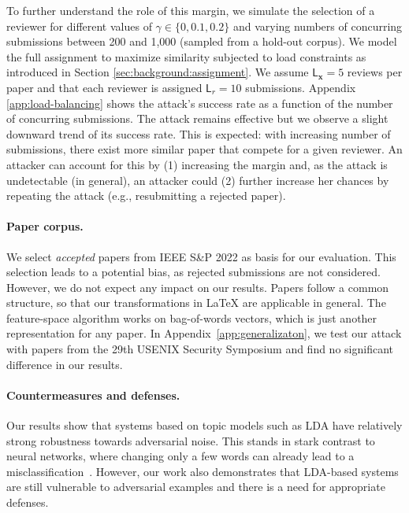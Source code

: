 \documentclass[letterpaper,twocolumn,10pt]{article}
\newcommand{\bow}{\textbf{x}}
\newcommand{\submission}{\bow}
\newcommand{\reviewer}{r}
\newcommand{\reviewerload}{\mathsf{L}_{\reviewer}}
\newcommand{\paperload}{\mathsf{L}_{\submission}}
\newcommand{\margin}{\gamma}
\begin{document}
To further understand the role of this margin, we simulate the selection of a reviewer for different values of $\margin \in \{0, 0.1, 0.2\}$ and varying numbers of concurring submissions between 200 and 1,000 (sampled from a hold-out corpus). We model the full assignment to maximize similarity subjected to load constraints as introduced in Section \ref{sec:background:assignment}. We assume $\paperload = 5$ reviews per paper and that each reviewer is assigned $\reviewerload = 10$ submissions.
Appendix \ref{app:load-balancing} shows the attack's success rate as a function of the number of concurring submissions. The attack remains effective but we observe a {slight\EndAccSupp{}} {downward\EndAccSupp{}} trend of its success rate. This is expected: with increasing number of submissions, there exist more similar paper that compete for a given reviewer. An attacker can account for this by (1) increasing the margin and, as the attack is {undetectable\EndAccSupp{}} (in general), an attacker could (2) further increase her chances by repeating the attack (e.g., resubmitting a rejected paper).

\paragraph{Paper corpus.}
We select \emph{accepted} papers from IEEE S\&P 2022 as basis for our evaluation. This selection leads to a potential bias, as rejected submissions are not considered. However, we do not expect any impact on our results. Papers follow a common structure, so that our transformations in \LaTeX{} are applicable in general. The feature-space algorithm works on bag-of-words vectors, which is just another representation for any paper.
In Appendix~\ref{app:generalizaton}, we test our attack with papers from the 29th USENIX Security Symposium and find no significant difference in our results.

\paragraph{Countermeasures and defenses.}
Our results show that systems based on topic models such as \ac{LDA} have relatively strong robustness towards adversarial noise. This stands in {stark\EndAccSupp{}} contrast to {neural\EndAccSupp{}} networks, where changing only a few words can already lead to a misclassification~\cite[e.g.,][]{gao-18-blackbox, li-19-textbugger}. However, our work also demonstrates that \ac{LDA}-based systems are still vulnerable to adversarial examples and there is a need for appropriate defenses. 
\end{document}
